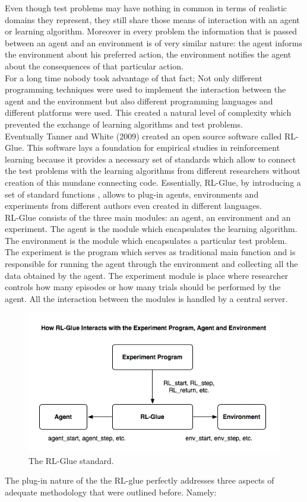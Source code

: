 Even though test problems may have nothing in common in terms of realistic domains they represent, they still share those means of interaction with an agent or learning algorithm. Moreover in every problem the information that is passed between an agent and an environment is of very similar nature: the agent informs the environment about his preferred action, the environment notifies the agent about the consequences of that particular action. \\

For a long time nobody took advantage of that fact; Not only different programming techniques were used to implement the interaction between the agent and the environment but also different programming languages and different platforms were used. This created a natural level of complexity which prevented the exchange of learning algorithms and test problems. \\

Eventually Tanner and White (2009)\cite{tanner2009rl} created an open source software called RL-Glue. This software lays a foundation for empirical studies in reinforcement learning because it provides a necessary set of standards which allow to connect the test problems with the learning algorithms from different researchers without creation of this mundane connecting code. Essentially, RL-Glue, by introducing a set of standard functions , allows to plug-in agents, environments and experiments from different authors even created in different languages. \\

RL-Glue consists of the three main modules: an agent, an environment and an experiment. The agent is the module which encapsulates the learning algorithm. The environment is the module which encapsulates a particular test problem. The experiment is the program which serves as traditional main function and is responsible for running the agent through the environment and collecting all the data obtained by the agent. The experiment module is place where researcher controls how many episodes or how many trials should be performed by the agent. All the interaction between the modules is handled by a central server. \\
\begin{figure}[ht]
\vskip 0.2in
\centering
\includegraphics[scale=0.9]{glue.png}
\caption{The RL-Glue standard.}
\vskip -0.2in
\label{rlglue}
\end{figure}
The plug-in nature of the the RL-glue perfectly addresses three aspects of adequate methodology that were outlined before. Namely:

